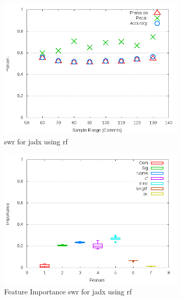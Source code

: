 \begin{figure}[!t]
\centering
\includegraphics[width=0.8\textwidth]{images/rf/test_1/jadx_sample_range.png}
\caption{\gls{swr} for jadx using \gls{rf}}
\label{fig:test_1_jadx_rf}
\end{figure}

\begin{figure}[!t]
\centering
\includegraphics[width=0.8\textwidth]{images/rf/test_1/jadx_importance.png}
\caption{Feature Importance \gls{swr} for jadx using \gls{rf}}
\label{fig:test_1_jadx_rf_importance}
\end{figure}

